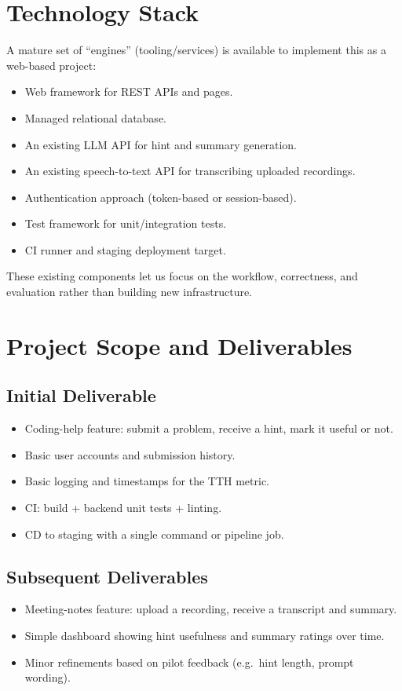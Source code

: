 \documentclass[11pt]{article}
\begin{document}
\section{Technology Stack}
A mature set of ``engines'' (tooling/services) is available to implement this as a web-based project:
\begin{itemize}
    \item Web framework for REST APIs and pages.
    \item Managed relational database.
    \item An existing LLM API for hint and summary generation.
    \item An existing speech-to-text API for transcribing uploaded recordings.
    \item Authentication approach (token-based or session-based).
    \item Test framework for unit/integration tests.
    \item CI runner and staging deployment target.
\end{itemize}
These existing components let us focus on the workflow, correctness, and evaluation rather than building new infrastructure.

\section{Project Scope and Deliverables}

\subsection{Initial Deliverable}
\begin{itemize}
    \item Coding-help feature: submit a problem, receive a hint, mark it useful or not.
    \item Basic user accounts and submission history.
    \item Basic logging and timestamps for the TTH metric.
    \item CI: build + backend unit tests + linting.
    \item CD to staging with a single command or pipeline job.
\end{itemize}

\subsection{Subsequent Deliverables}
\begin{itemize}
    \item Meeting-notes feature: upload a recording, receive a transcript and summary.
    \item Simple dashboard showing hint usefulness and summary ratings over time.
    \item Minor refinements based on pilot feedback (e.g.\ hint length, prompt wording).
\end{itemize}
\end{document}
